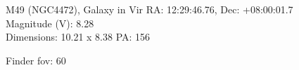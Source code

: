 \begin{block}{M49 (NGC4472), Galaxy in Vir}
    RA: 12:29:46.76, Dec: +08:00:01.7 \\ 
    Magnitude (V): 8.28 \\ 
    Dimensions: 10.21 x 8.38 PA: 156 

    Finder fov: 60 
\end{block}